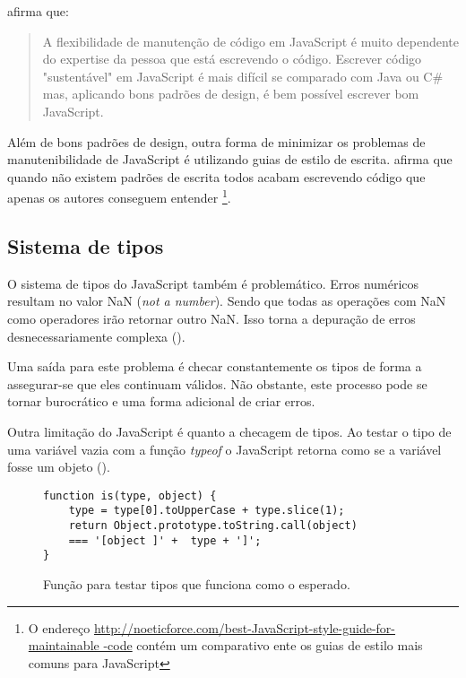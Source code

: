 \citet{html5Tradeoffs} afirma que:
\begin{quote}
A flexibilidade de manutenção de código em JavaScript é muito
dependente do expertise da pessoa que está escrevendo o código.
Escrever código "sustentável" em JavaScript é mais difícil se
comparado com Java ou C\# mas, aplicando bons padrões de design, é bem
possível escrever bom JavaScript.
\end{quote}

Além de bons padrões de design, outra forma de minimizar os
problemas de manutenibilidade de JavaScript é utilizando guias
de estilo de escrita. \citet{jsStyleGuide} afirma que quando
não existem padrões de escrita todos acabam escrevendo código
que apenas os autores conseguem entender \footnote{O endereço
\url{http://noeticforce.com/best-JavaScript-style-guide-for-maintainable
-code} contém um comparativo ente os guias de estilo mais comuns para
JavaScript}.

\subsection{Sistema de tipos}

O sistema de tipos do JavaScript também é problemático.
Erros numéricos resultam no valor NaN (\textit{not a number}).
Sendo que todas as operações com NaN como operadores irão retornar outro
NaN. Isso torna a depuração de erros desnecessariamente complexa
\autocite{html5mostwanted} ().

Uma saída para este problema é checar constantemente os tipos de forma
a assegurar-se que eles continuam válidos. Não obstante, este processo
pode se tornar burocrático e uma forma adicional de criar erros.

Outra limitação do JavaScript é quanto a checagem de tipos. Ao
testar o tipo de uma variável vazia com a função \textit{typeof} o
JavaScript retorna como se a variável fosse um objeto ().

\begin{figure}[H]
\centering
\begin{verbatim}
function is(type, object) {
    type = type[0].toUpperCase + type.slice(1);
    return Object.prototype.toString.call(object)
    === '[object ]' +  type + ']';
}
\end{verbatim}
\caption{Função para testar tipos que funciona como o esperado.}
\label{fig:fixJSTypes}
\end{figure}

